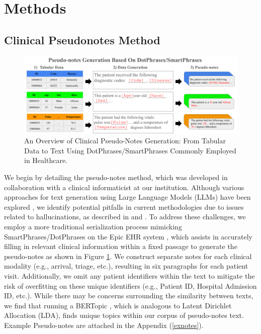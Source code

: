 \documentclass[pmlr]{jmlr}%
\begin{document}
\section{Methods}

\subsection{Clinical Pseudonotes Method}

 \begin{figure}[t]
   \centering 
   \includegraphics[width=\textwidth]{pseudo.png} 
   \caption{An Overview of Clinical Pseudo-Notes Generation: From Tabular Data to Text Using DotPhrases/SmartPhrases Commonly Employed in Healthcare.}
   \label{fig11} 
    \vspace*{-0.5cm}
 \end{figure} 
We begin by detailing the pseudo-notes method, which was developed in collaboration with a clinical informaticist at our institution. Although various approaches for text generation using Large Language Models (LLMs) have been explored \citep{hegselmann2024data} \citep{ellershaw2024automated}, we identify potential pitfalls in current methodologies due to issues related to hallucinations, as described in \citep{hegselmann2024data} and \citep{lee2024large}. To address these challenges, we employ a more traditional serialization process mimicking SmartPhrases/DotPhrases on the Epic
EHR system \citep{chang2021emr}, which assists in accurately filling in relevant clinical information within a fixed passage to generate the pseudo-notes as shown in Figure \ref{fig11}. We construct separate notes for each clinical modality (e.g., arrival, triage, etc.), resulting in six paragraphs for each patient visit. Additionally, we omit any patient identifiers within the text to mitigate the risk of overfitting on these unique identifiers (e.g., Patient ID, Hospital Admission ID, etc.). While there may be concerns surrounding the similarity between texts, we find that running a BERTopic \citep{grootendorst2022bertopic}, which is analogous to Latent Dirichlet Allocation (LDA), finds unique topics within our corpus of pseudo-notes text. Example Pseudo-notes are attached in the Appendix (\ref{exnotes}).
\end{document}
